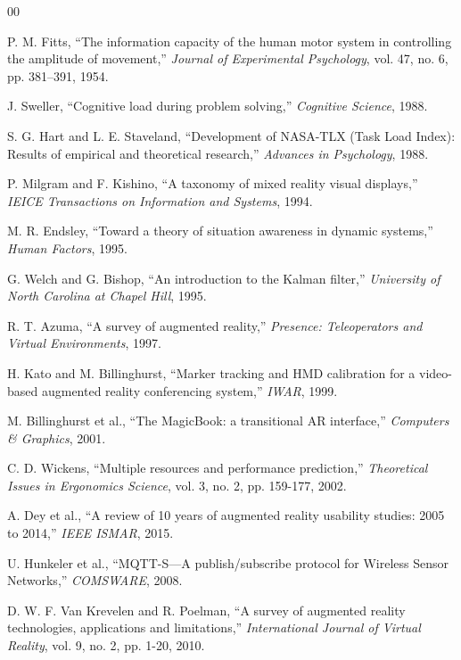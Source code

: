 \documentclass[conference]{IEEEtran}
\begin{document}
\begin{thebibliography}{00}

 P. M. Fitts, ``The information capacity of the human motor system in controlling the amplitude of movement,'' \textit{Journal of Experimental Psychology}, vol. 47, no. 6, pp. 381--391, 1954.


 J. Sweller, ``Cognitive load during problem solving,'' \textit{Cognitive Science}, 1988.

 S. G. Hart and L. E. Staveland, ``Development of NASA-TLX (Task Load Index): Results of empirical and theoretical research,'' \textit{Advances in Psychology}, 1988.

 P. Milgram and F. Kishino, ``A taxonomy of mixed reality visual displays,'' \textit{IEICE Transactions on Information and Systems}, 1994.

 M. R. Endsley, ``Toward a theory of situation awareness in dynamic systems,'' \textit{Human Factors}, 1995.

 G. Welch and G. Bishop, ``An introduction to the Kalman filter,'' \textit{University of North Carolina at Chapel Hill}, 1995.

 R. T. Azuma, ``A survey of augmented reality,'' \textit{Presence: Teleoperators and Virtual Environments}, 1997.

 H. Kato and M. Billinghurst, ``Marker tracking and HMD calibration for a video-based augmented reality conferencing system,'' \textit{IWAR}, 1999.


 M. Billinghurst et al., ``The MagicBook: a transitional AR interface,'' \textit{Computers \& Graphics}, 2001.

 C. D. Wickens, ``Multiple resources and performance prediction,'' \textit{Theoretical Issues in Ergonomics Science}, vol. 3, no. 2, pp. 159-177, 2002.

 A. Dey et al., ``A review of 10 years of augmented reality usability studies: 2005 to 2014,'' \textit{IEEE ISMAR}, 2015.

 U. Hunkeler et al., ``MQTT-S---A publish/subscribe protocol for Wireless Sensor Networks,'' \textit{COMSWARE}, 2008.


 D. W. F. Van Krevelen and R. Poelman, ``A survey of augmented reality technologies, applications and limitations,'' \textit{International Journal of Virtual Reality}, vol. 9, no. 2, pp. 1-20, 2010.


\end{thebibliography}
\end{document}
